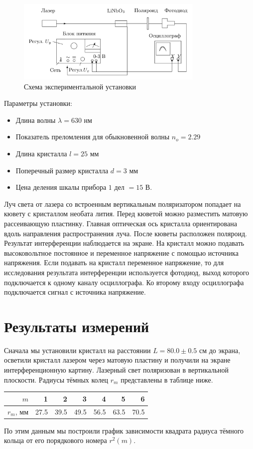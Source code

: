 \begin{figure}[H]
	\centering
	\includegraphics[width=0.8\textwidth]{Изображения/facility.png}
	\caption{Схема экспериментальной установки}
\end{figure}
\n
Параметры установки:
\begin{itemize}
\item Длина волны $\lambda = 630$ нм
\item Показатель преломления для обыкновенной волны $n_o = 2.29$
\item Длина кристалла $l = 25$ мм
\item Поперечный размер кристалла $d = 3$ мм
\item Цена деления шкалы прибора $1$ дел $= 15$ В.
\end{itemize}
\n
Луч света от лазера со встроенным вертикальным поляризатором попадает на кювету с кристаллом необата лития. Перед кюветой можно разместить матовую рассеивающую пластинку. Главная оптическая ось кристалла ориентирована вдоль направления распространения луча. После кюветы расположен поляроид. Результат интерференции наблюдается на экране. На кристалл можно подавать высоковольтное постоянное и переменное напряжение с помощью источника напряжения. Если подавать на кристалл переменное напряжение, то для исследования результата интерференции используется фотодиод, выход которого подключается к одному каналу осциллографа. Ко второму входу осциллографа подключается сигнал с источника напряжение.
	
\section*{Результаты измерений}

Сначала мы установили кристалл на расстоянии $L = 80.0 \pm 0.5$ см до экрана, осветили кристалл лазером через матовую пластину и получили на экране интерференционную картину. Лазерный свет поляризован в вертикальной плоскости. Радиусы тёмных колец $r_m$ представлены в таблице ниже. 

\begin{table}[H]
	\centering
\begin{tabular}{|r|r|r|r|r|r|r|}
	\hline
	$m$ & 1 & 2 & 3 & 4 & 5 & 6 \\
	\hline
	$r_m$, мм & 27.5 & 39.5 & 49.5 & 56.5 & 63.5 & 70.5 \\
	\hline
\end{tabular}
\end{table}
\n
По этим данным мы построили график зависимости квадрата радиуса тёмного кольца от его порядкового номера $r^2(m)$.

